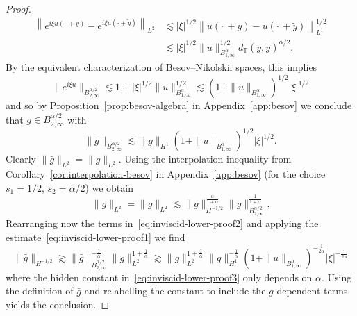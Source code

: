 \documentclass[11pt,oneside,reqno]{amsart}
\numberwithin{equation}{section}
\begin{document}
\begin{proof}
  \begin{align*}
    \left\| e^{i \xi u \left( \cdot \, + y \right)} - e^{i \xi u (\cdot +
    \tilde{y})} \right\|_{L^2} & \lesssim | \xi |^{1 / 2} \left\| u \left(
    \cdot \, + y \right) - u \left( \cdot \, + \tilde{y} \right)
    \right\|_{L^1}^{1 / 2}\\
    & \lesssim | \xi |^{1 / 2} \| u \|^{1 / 2}_{B^{\alpha}_{1, \infty}}
    d_{\mathbb{T}} (y, \tilde{y})^{\alpha / 2} .
  \end{align*}
%  
  By the equivalent characterization of Besov--Nikolskii spaces, this implies
  \[ \| e^{i \xi u} \|_{B^{\alpha / 2}_{2, \infty}} \lesssim 1 + | \xi |^{1 /
     2} \| u \|^{1 / 2}_{B^{\alpha}_{1, \infty}} \lesssim (1 + \| u
     \|_{B^{\alpha}_{1, \infty}})^{1 / 2} | \xi |^{1 / 2} \]
  and so by Proposition~\ref{prop:besov-algebra} in Appendix~\ref{app:besov}
  we conclude that $\bar{g} \in B^{\alpha / 2}_{2, \infty}$ with
  \begin{equation}
    \| \bar{g} \|_{B^{\alpha / 2}_{2, \infty}} \lesssim \| g \|_{H^1} (1 + \|
    u \|_{B^{\alpha}_{1, \infty}})^{1 / 2} | \xi |^{1 / 2} .
    \label{eq:inviscid-lower-proof1}
  \end{equation}
  Clearly $\| \bar{g} \|_{L^2} = \| g \|_{L^2}$. Using the interpolation
  inequality from Corollary~\ref{cor:interpolation-besov} in
  Appendix~\ref{app:besov} (for the choice $s_1 = 1 / 2$, $s_2 = \alpha / 2$)
  we obtain
  \begin{equation}
    \| g \|_{L^2} = \| \bar{g} \|_{L^2} \lesssim \| \bar{g} \|_{H^{- 1 /
    2}}^{\frac{\alpha}{1 + \alpha}}  \| \bar{g} \|_{B^{\alpha / 2}_{2,
    \infty}}^{\frac{1}{1 + \alpha}} . \label{eq:inviscid-lower-proof2}
  \end{equation}
  Rearranging now the terms in~\eqref{eq:inviscid-lower-proof2} and applying
  the estimate~\eqref{eq:inviscid-lower-proof1} we find
  \begin{equation} \label{eq:inviscid-lower-proof3}
      \| \bar{g} \|_{H^{- 1 / 2}}
       \gtrsim \| \bar{g} \|_{B^{\alpha /
      2}_{2, \infty}}^{- \frac{1}{\alpha}}  \| g \|_{L^2}^{1 +
      \frac{1}{\alpha}}
      \gtrsim \| g \|_{L^2}^{1 + \frac{1}{\alpha}} \| g \|_{H^1}^{-
      \frac{1}{\alpha}} (1 + \| u \|_{B^{\alpha}_{1, \infty}})^{- \frac{1}{2
      \alpha}} | \xi |^{- \frac{1}{2 \alpha}}
  \end{equation}
  where the hidden constant in~\eqref{eq:inviscid-lower-proof3} only depends
  on $\alpha$. Using the definition of $\bar{g}$ and relabelling the constant
  to include the $g$-dependent terms yields the conclusion.
\end{proof}
\end{document}
